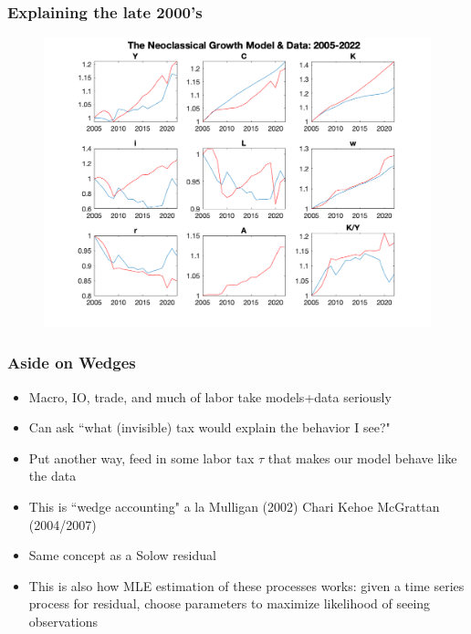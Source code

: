 \documentclass{beamer}
\begin{document}
\begin{frame}
\frametitle[alignment=center]{Explaining the late 2000's}
\begin{figure}
\centering
\includegraphics[scale=0.5]{Figures/Figure_9.png}
\end{figure}
\end{frame}

\begin{frame}
\frametitle[alignment=center]{Aside on Wedges}
\begin{itemize}
\item Macro, IO, trade, and much of labor take models+data seriously
\bigskip
\item Can ask ``what (invisible) tax would explain the behavior I see?"
\bigskip
\item Put another way, feed in some labor tax $\tau$ that makes our model behave like the data
\bigskip
\item This is ``wedge accounting" a la Mulligan (2002) Chari Kehoe McGrattan (2004/2007) 
\bigskip
\item Same concept as a Solow residual
\bigskip
\item This is also how MLE estimation of these processes works:  given a time series process for residual, choose parameters to maximize likelihood of seeing observations
\end{itemize}
\end{frame}
\end{document}
